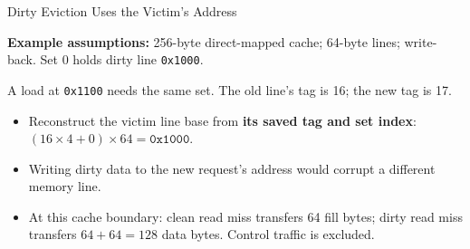 \documentclass[aspectratio=169,11pt,t]{beamer}
\newcommand{\key}[1]{\textbf{#1}}
\newcommand{\hex}[1]{\texttt{0x#1}}
\newcommand{\Model}[1]{\par{\scriptsize\color{deepblue}\textbf{Example assumptions:} #1\par}\vspace{.14cm}}
\begin{document}
\begin{frame}{Dirty Eviction Uses the Victim's Address}
\small
\Model{256-byte direct-mapped cache; 64-byte lines; write-back. Set 0 holds dirty line \hex{1000}.}
A load at \hex{1100} needs the same set. The old line's tag is 16; the new tag is 17.
\begin{center}
\end{center}
\begin{itemize}\setlength{\itemsep}{5pt}
  \item Reconstruct the victim line base from \key{its saved tag and set index}: \((16\times4+0)\times64=\hex{1000}\).
  \item Writing dirty data to the new request's address would corrupt a different memory line.
  \item At this cache boundary: clean read miss transfers 64 fill bytes; dirty read miss transfers \(64+64=128\) data bytes. Control traffic is excluded.
\end{itemize}
\end{frame}
\end{document}
